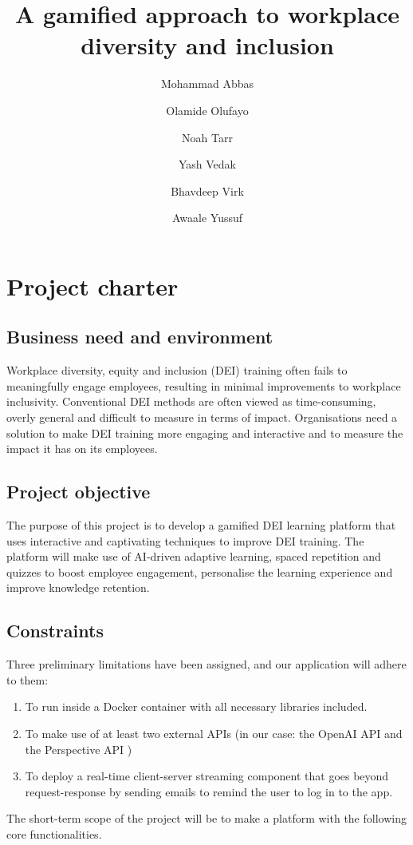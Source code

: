 \documentclass{scrartcl}
\title{A gamified approach to workplace diversity and inclusion}
\author{
  Mohammad Abbas\\\email{m-00104@surrey.ac.uk}
  \and
  Olamide Olufayo\\\email{oo01267@surrey.ac.uk}
  \and
  Noah Tarr\\\email{nt00654@surrey.ac.uk}
  \and
  Yash Vedak\\\email{yv00051@surrey.ac.uk}
  \and
  Bhavdeep Virk\\\email{bv00152@surrey.ac.uk}
  \and
  Awaale Yussuf\\\email{ay00487@surrey.ac.uk}
}
\begin{document}
\maketitle
\newpage
\tableofcontents
\section{Project charter}
\subsection{Business need and environment}
Workplace diversity, equity and inclusion (DEI) training often fails to meaningfully engage employees, resulting in minimal improvements to workplace inclusivity.
Conventional DEI methods are often viewed as time-consuming, overly general and difficult to measure in terms of impact.
Organisations need a solution to make DEI training more engaging and interactive and to measure the impact it has on its employees.

\subsection{Project objective}
The purpose of this project is to develop a gamified DEI learning platform that uses interactive and captivating techniques to improve DEI training. The platform will make use of AI-driven adaptive learning, spaced repetition and quizzes to boost employee engagement, personalise the learning experience and improve knowledge retention.

\subsection{Constraints}
Three preliminary limitations have been assigned, and our application will adhere to them:
\begin{enumerate}
\item To run inside a Docker \parencite{docker} container with all necessary libraries included.
\item To make use of at least two external APIs (in our case: the OpenAI API \parencite{openai-api} and the Perspective API \parencite{perspective-api})
\item To deploy a real-time client-server streaming component that goes beyond request-response by sending emails to remind the user to log in to the app.
\end{enumerate}

The short-term scope of the project will be to make a platform with the following core functionalities.
\end{document}
